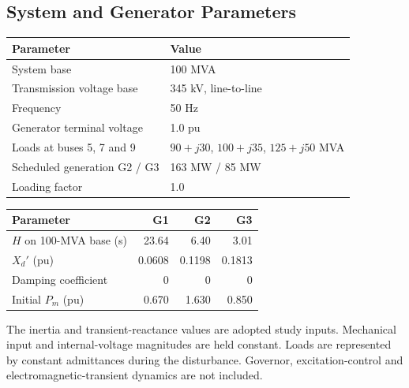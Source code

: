 \documentclass[11pt,a4paper]{article}
\begin{document}
\subsection{System and Generator Parameters}
\begin{center}\begin{tabular}{ll}\toprule Parameter&Value\\\midrule
System base&100 MVA\\ Transmission voltage base&345 kV, line-to-line\\ Frequency&50 Hz\\ Generator terminal voltage&1.0 pu\\ Loads at buses 5, 7 and 9&$90+j30$, $100+j35$, $125+j50$ MVA\\ Scheduled generation G2 / G3&163 MW / 85 MW\\ Loading factor&1.0\\\bottomrule\end{tabular}\end{center}
\begin{center}\begin{tabular}{lrrr}\toprule Parameter&G1&G2&G3\\\midrule
$H$ on 100-MVA base (s)&23.64&6.40&3.01\\
$X_d'$ (pu)&0.0608&0.1198&0.1813\\
Damping coefficient&0&0&0\\
Initial $P_m$ (pu)&0.670&1.630&0.850\\\bottomrule\end{tabular}\end{center}
The inertia and transient-reactance values are adopted study inputs. Mechanical input and internal-voltage magnitudes are held constant. Loads are represented by constant admittances during the disturbance. Governor, excitation-control and electromagnetic-transient dynamics are not included.
\newpage
\end{document}
